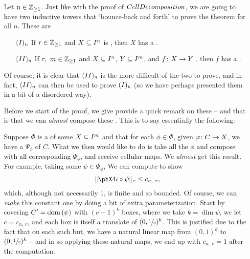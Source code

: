 \begin{theorem}
  Let $n \in \Zgeq{1}$. Just like with the proof of $\CD$, we are going to have two inductive towers that `bounce-back and forth' to prove the theorem for all $n$. These are
    \begin{enumerate}[label={}]
    \item[$\In$ ] If $r \in \Zgeq{1}$ and $\CIn[X]{n}$ is , then $X$ has a \cellrparam.
    \item[$\IIn$ ] If $r, \ m \in \Zgeq{1}$ and $\CIn[X]{n}$, $\CIn[Y]{m}$, and $\funcdom{f}{X}{Y}$ , then $f$ has a \cellrparam.
  \end{enumerate}
  Of course, it is clear that $\IIn$ is the more difficult of the two to prove, and in fact, $\IIn$ can then be used to prove $\In$ (so we have perhaps presented them in a bit of a disordered way).
  \label{thm:existence}
\end{theorem}

Before we start of the proof, we give provide a quick remark on these \cellrparams -- and that is that we can \emph{almost} compose these \cellrparams. This is to say essentially the following:

\begin{remark}
  Suppose $\Phi$ is a \cellrparam of some $\CIn[X]{m}$ and that for each $\phi \in \Phi$, given $\funcdom{\phi}{C}{X}$, we have a \cellrparam $\Psi_{\phi}$ of $C$. What we then would like to do is take all the $\phi$ and compose with all corresponding $\Psi_{\phi}$, and receive cellular maps. We \emph{almost} get this result. For example, taking some $\psi \in \Psi_{\phi}$, We can compute to show
    \begin{align*}
      \rnorm[r]{\phX4i \circ \psi} \leq c_{n, \ r},
    \end{align*}
    which, although not necessarily 1, is finite and so bounded. Of course, we can \emph{make} this constant one by doing a bit of extra parameterization. Start by covering $\pri{C} = \dom{\psi}$ with $(c + 1)^k$ boxes, where we take $k = \dim{\psi}$, we let $c = c_{n, \ r}$, and each box is itself a translate of $(0, \sfrac{1}{c})^k$. This is justified due to the fact that on each such but, we have a natural linear map from $(0, 1)^k$ to $(0, \sfrac{1}{c})^k$ -- and in so applying these natural maps, we end up with $c_{n, \ r} = 1$ after the computation.

\end{remark}

